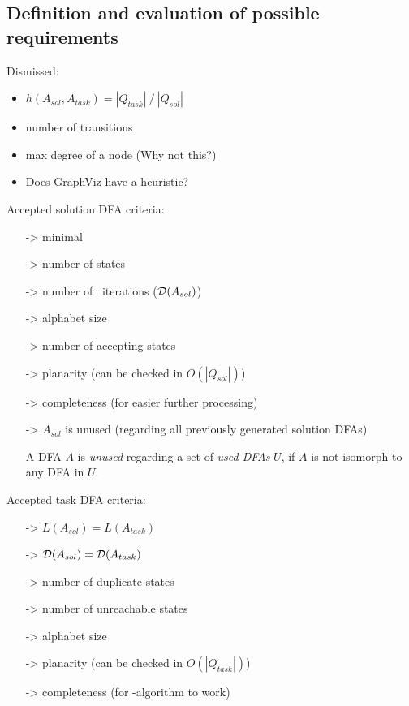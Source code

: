 \subsection{Definition and evaluation of possible requirements}

\label{ch:1:determined-requirements}
Dismissed:
\begin{itemize}
	\item $h(A_{sol}, A_{task}) = |Q_{task}|\ /\ |Q_{sol}|$
	\item number of transitions
	\item max degree of a node (Why not this?)
	\item Does GraphViz have a heuristic?
\end{itemize}
Accepted solution DFA criteria:
\begin{itemize}
	\item[->] minimal
	\item[->] number of states
	\item[->] number of \MinMark\ iterations ($\mathcal{D}(A_{sol})$)
	\item[->] alphabet size
	\item[->] number of accepting states
	\item[->] planarity (can be checked in $O(|Q_{sol}|)$)
	\item[->] completeness (for easier further processing)
	\item[->] $A_{sol}$ is unused (regarding all previously generated solution DFAs)
	
	\begin{definition} \label{ch:1:unused-dfa}
		A DFA $A$ is \emph{unused} regarding a set of \emph{used DFAs} $U$, if $A$ is not isomorph to any DFA in $U$.
	\end{definition}
\end{itemize}
Accepted task DFA criteria:
\begin{itemize}
	\item[->] $L(A_{sol}) = L(A_{task})$
	\item[->] $\mathcal{D}(A_{sol}) = \mathcal{D}(A_{task})$
	\item[->] number of duplicate states
	\item[->] number of unreachable states
	\item[->] alphabet size
	\item[->] planarity (can be checked in $O(|Q_{task}|)$)
	\item[->] completeness (for \MinMark-algorithm to work)
\end{itemize}

